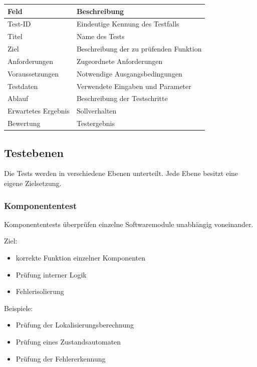 \documentclass[
  a4paper,
  12pt,
  DIV=12,        %
  parskip=half,  %
  headings=small %
]{scrartcl}
\theoremstyle{definition}
\providecommand{\tightlist}{%
  \setlength{\itemsep}{0pt}\setlength{\parskip}{0pt}}
\theoremstyle{definition}
\begin{document}
\begin{longtable}[]{@{}ll@{}}
\toprule\noalign{}
Feld & Beschreibung \\
\midrule\noalign{}
\endhead
\bottomrule\noalign{}
\endlastfoot
Test-ID & Eindeutige Kennung des Testfalls \\
Titel & Name des Tests \\
Ziel & Beschreibung der zu prüfenden Funktion \\
Anforderungen & Zugeordnete Anforderungen \\
Voraussetzungen & Notwendige Ausgangsbedingungen \\
Testdaten & Verwendete Eingaben und Parameter \\
Ablauf & Beschreibung der Testschritte \\
Erwartetes Ergebnis & Sollverhalten \\
Bewertung & Testergebnis \\
\end{longtable}

\subsection{Testebenen}\label{testebenen}

Die Tests werden in verschiedene Ebenen unterteilt. Jede Ebene besitzt
eine eigene Zielsetzung.

\subsubsection{Komponententest}\label{komponententest}

Komponententests überprüfen einzelne Softwaremodule unabhängig
voneinander.

Ziel:

\begin{itemize}
\tightlist
\item
  korrekte Funktion einzelner Komponenten
\item
  Prüfung interner Logik
\item
  Fehlerisolierung
\end{itemize}

Beispiele:

\begin{itemize}
\tightlist
\item
  Prüfung der Lokalisierungsberechnung
\item
  Prüfung eines Zustandsautomaten
\item
  Prüfung der Fehlererkennung
\end{itemize}
\end{document}
